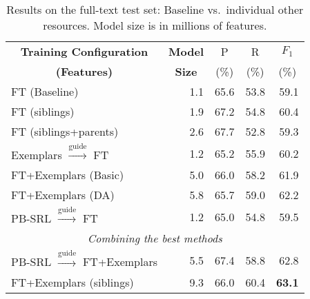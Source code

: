 
\setlength\tabcolsep{4pt}

\begin{table}\centering\small
\def\arraystretch{1}
\begin{tabular}{lr<{\hspace*{5pt}}rrr}%
\toprule
\multicolumn{1}{c}{\textbf{Training Configuration}} 
& \multicolumn{1}{c}{\textbf{Model}} &  \multicolumn{1}{c}{P} &
\multicolumn{1}{c}{R} 
&  \multicolumn{1}{c}{$F_1$} \\
 \multicolumn{1}{c}{\textbf{(Features)}} 
& \multicolumn{1}{c}{\textbf{Size}} 
&  \multicolumn{1}{c}{(\%)} &  \multicolumn{1}{c}{(\%)} &  \multicolumn{1}{c}{(\%)}\\
\midrule
FT (Baseline) & 1.1 & 65.6 & 53.8 & 59.1 \\ %
\midrule
FT (siblings) & 1.9 & 67.2 & 54.8 & 60.4 \\
FT (siblings+parents) & 2.6 & 67.7 & 52.8 & 59.3 \\
\midrule
Exemplars $\xrightarrow{\text{guide}}$ FT & 1.2 & 65.2 & 55.9 & 60.2 \\
FT+Exemplars (Basic) & 5.0 & 66.0 & 58.2 & 61.9 \\
FT+Exemplars (DA) & 5.8 & 65.7 & 59.0 & 62.2 \\
\midrule
PB-SRL $\xrightarrow{\text{guide}}$ FT & 1.2 & 65.0 & 54.8 & 59.5 \\
\midrule
\multicolumn{5}{c}{\em{Combining the best methods}}\\
\midrule
PB-SRL $\xrightarrow{\text{guide}}$ FT+Exemplars & 5.5 & 67.4 & 58.8 & 62.8 \\
FT+Exemplars (siblings) & 9.3 & 66.0 & 60.4 & \textbf{63.1} \\
\bottomrule
\end{tabular}
\caption{Results on the full-text test set:
Baseline vs.~individual other resources.  Model size is in
millions of features.
\label{tbl:results}}
\end{table}

